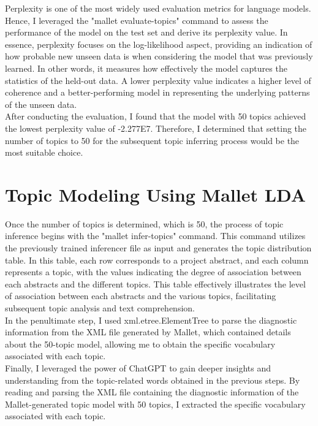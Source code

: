 \documentclass[12pt,twoside]{report}
\begin{document}
Perplexity is one of the most widely used evaluation metrics for language models. Hence, I leveraged the "mallet evaluate-topics" command to assess the performance of the model on the test set and derive its perplexity value. In essence, perplexity focuses on the log-likelihood aspect, providing an indication of how probable new unseen data is when considering the model that was previously learned. In other words, it measures how effectively the model captures the statistics of the held-out data.\cite{kapadia2022evaluate} A lower perplexity value indicates a higher level of coherence and a better-performing model in representing the underlying patterns of the unseen data.\cite{neishabouri2020reliability}\\

After conducting the evaluation, I found that the model with 50 topics achieved the lowest perplexity value of -2.277E7. Therefore, I determined that setting the number of topics to 50 for the subsequent topic inferring process would be the most suitable choice.\\

\section*{Topic Modeling Using Mallet LDA}
Once the number of topics is determined, which is 50, the process of topic inference begins with the "mallet infer-topics" command. This command utilizes the previously trained inferencer file as input and generates the topic distribution table. In this table, each row corresponds to a project abstract, and each column represents a topic, with the values indicating the degree of association between each abstracts and the different topics. This table effectively illustrates the level of association between each abstracts and the various topics, facilitating subsequent topic analysis and text comprehension.\\

In the penultimate step, I used xml.etree.ElementTree to parse the diagnostic information from the XML file generated by Mallet, which contained details about the 50-topic model, allowing me to obtain the specific vocabulary associated with each topic.\\

Finally, I leveraged the power of ChatGPT to gain deeper insights and understanding from the topic-related words obtained in the previous steps. By reading and parsing the XML file containing the diagnostic information of the Mallet-generated topic model with 50 topics, I extracted the specific vocabulary associated with each topic.\\
\end{document}

